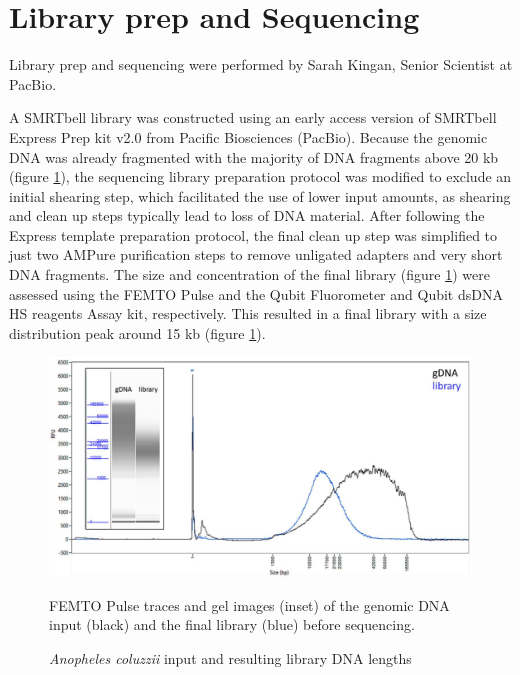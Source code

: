 \section{Library prep and Sequencing}

Library prep and sequencing were performed by Sarah Kingan, Senior Scientist at PacBio. \\

\par{
A SMRTbell library was constructed using an early access version of SMRTbell Express Prep kit v2.0 from Pacific Biosciences (PacBio). Because the genomic DNA was already fragmented with the majority of DNA fragments above 20 kb (figure \ref{figure:fempto}), the sequencing library preparation protocol was modified to exclude an initial shearing step, which facilitated the use of lower input amounts, as shearing and clean up steps typically lead to loss of DNA material. After following the Express template preparation protocol, the final clean up step was simplified to just two AMPure purification steps to remove unligated adapters and very short DNA fragments. The size and concentration of the final library (figure  \ref{figure:fempto}) were assessed using the FEMTO Pulse and the Qubit Fluorometer and Qubit dsDNA HS reagents Assay kit, respectively. This resulted in a final library with a size distribution peak around 15 kb (figure \ref{figure:fempto}). 
}


\begin{figure}[htbp!]
\caption{\textit{Anopheles coluzzii} input and resulting library DNA lengths}
\label{figure:fempto}
\begin{centering}
\includegraphics[width=.85\textwidth]{fempto.png}
\par{ FEMTO Pulse traces and gel images (inset) of the genomic DNA input (black) and the final library (blue) before sequencing. }
\end{centering}
\end{figure}

